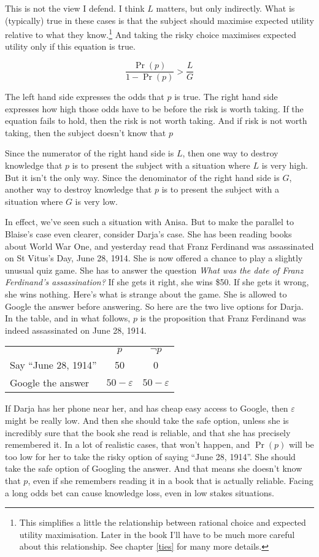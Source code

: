 \documentclass[11pt,]{book}
\let\rmarkdownfootnote\footnote%
\def\footnote{\protect\rmarkdownfootnote}
\def\toprule{}
\def\bottomrule{}
\begin{document}
This is not the view I defend. I think \(L\) matters, but only indirectly. What is (typically) true in these cases is that the subject should maximise expected utility relative to what they know.\footnote{This simplifies a little the relationship between rational choice and expected utility maximisation. Later in the book I'll have to be much more careful about this relationship. See chapter \ref{ties} for many more details.} And taking the risky choice maximises expected utility only if this equation is true.

\[
\frac{\Pr(p)}{1 - \Pr(p)} > \frac{L}{G}
\]

The left hand side expresses the odds that \(p\) is true. The right hand side expresses how high those odds have to be before the risk is worth taking. If the equation fails to hold, then the risk is not worth taking. And if risk is not worth taking, then the subject doesn't know that \(p\)

Since the numerator of the right hand side is \(L\), then one way to destroy knowledge that \(p\) is to present the subject with a situation where \(L\) is very high. But it isn't the only way. Since the denominator of the right hand side is \(G\), another way to destroy knowledge that \(p\) is to present the subject with a situation where \(G\) is very low.

In effect, we've seen such a situation with Anisa. But to make the parallel to Blaise's case even clearer, consider Darja's case. She has been reading books about World War One, and yesterday read that Franz Ferdinand was assassinated on St Vitus's Day, June 28, 1914. She is now offered a chance to play a slightly unusual quiz game. She has to answer the question \emph{What was the date of Franz Ferdinand's assassination?} If she gets it right, she wins \$50. If she gets it wrong, she wins nothing. Here's what is strange about the game. She is allowed to Google the answer before answering. So here are the two live options for Darja. In the table, and in what follows, \(p\) is the proposition that Franz Ferdinand was indeed assassinated on June 28, 1914.

\begin{longtable}[]{@{}lcc@{}}
\toprule
\endhead
& \(p\) & \(\neg p\)\tabularnewline
Say ``June 28, 1914'' & 50 & 0\tabularnewline
Google the answer & \(50 - \varepsilon\) & \(50 - \varepsilon\)\tabularnewline
\bottomrule
\end{longtable}

If Darja has her phone near her, and has cheap easy access to Google, then \(\varepsilon\) might be really low. And then she should take the safe option, unless she is incredibly sure that the book she read is reliable, and that she has precisely remembered it. In a lot of realistic cases, that won't happen, and \(\Pr(p)\) will be too low for her to take the risky option of saying ``June 28, 1914''. She should take the safe option of Googling the answer. And that means she doesn't know that \(p\), even if she remembers reading it in a book that is actually reliable. Facing a long odds bet can cause knowledge loss, even in low stakes situations.
\end{document}
